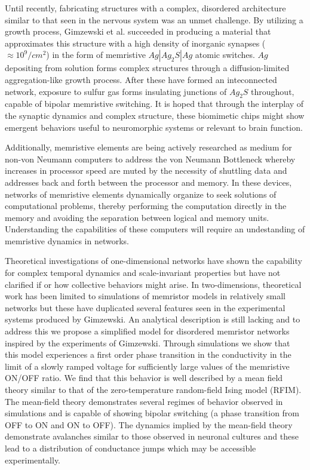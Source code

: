 \documentclass[aps,prl,reprint,groupedaddress]{revtex4-1}
\begin{document}
Until recently, fabricating structures with a complex, disordered architecture
similar to that seen in the nervous system was an unmet challenge.  By
utilizing a growth process, Gimzewski et al. succeeded in producing a material
that approximates this structure with a high density of inorganic synapses
($\approx 10^9 /cm^2$) in the form of memristive $Ag|Ag_2 S|Ag$ atomic
 switches.  $Ag$ depositing from solution forms complex structures through a
diffusion-limited aggregation-like growth process.  After these have formed
an inteconnected network, exposure to sulfur gas forms insulating junctions
of $Ag_2 S$ throughout, capable of bipolar memristive switching.
It is hoped that through the interplay of the synaptic dynamics and complex
structure, these biomimetic chips might show emergent behaviors useful to
neuromorphic systems or relevant to brain function.

Additionally, memristive elements are being actively researched as medium for
non-von Neumann computers to address the von Neumann Bottleneck
\cite{Backus1978} whereby increases in processor speed are muted by the
necessity of shuttling data and addresses back and forth between the
processor and memory.  In these devices, networks of memristive elements
dynamically organize to seek solutions of computational problems, thereby
performing the computation directly in the memory and avoiding the separation
between logical and memory units.  Understanding
the capabilities of these computers will require an undestanding of memristive
dynamics in networks.

Theoretical investigations of one-dimensional networks have shown the
capability for complex temporal dynamics and scale-invariant properties but
have not clarified if or how collective behaviors might arise.  In
two-dimensions, theoretical work has been limited to simulations of memristor
models in relatively small networks but these have duplicated several features
seen in the experimental systems produced by Gimzewski.  An analytical
description is still lacking and to address this we propose a simplified model
for disordered memristor networks inspired by the experiments of Gimzewski.
Through simulations we show that this model experiences a first order phase
transition in the conductivity in the limit of a slowly ramped voltage for
sufficiently large values of the memristive ON/OFF
ratio.  We find that this behavior is well described by a mean field theory
similar to that of the zero-temperature random-field Ising model (RFIM).
The mean-field theory
demonstrates several regimes of behavior observed in simulations and is
capable of showing bipolar switching (a phase transition from OFF to ON and
ON to OFF).  The dynamics implied by the mean-field theory demonstrate
avalanches similar to those observed in neuronal cultures and these lead
to a distribution of conductance jumps which may be accessible experimentally.
\end{document}
